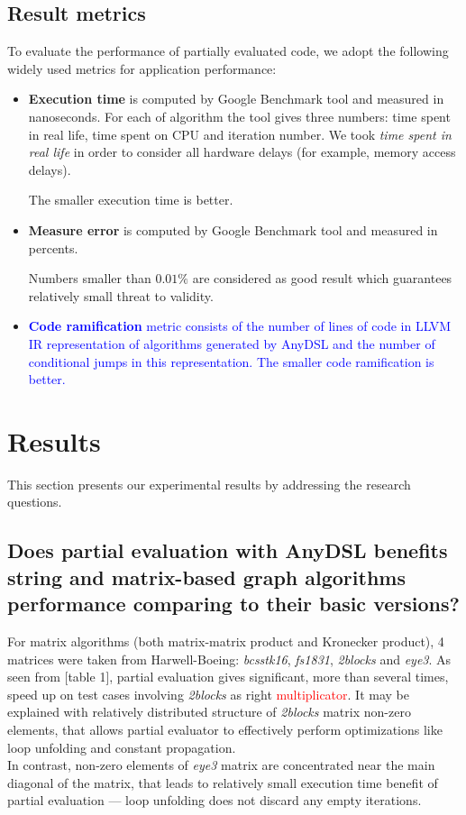 \documentclass[conference]{IEEEtran}
\begin{document}
\subsection{Result metrics}
To evaluate the performance of partially evaluated code, we adopt the following widely used metrics for application performance:
\begin{itemize}
	\item \textbf{Execution time} is computed by Google Benchmark tool and measured in nanoseconds. For each of algorithm the tool gives three numbers: time spent in real life, time spent on CPU and iteration number. We took \textit{time spent in real life} in order to consider all hardware delays (for example, memory access delays).
	
	The smaller execution time is better.
	
	\item \textbf{Measure error} is computed by Google Benchmark tool and measured in percents. 
	
	Numbers smaller than $0.01\%$ are considered as good result which guarantees relatively small threat to validity.
	
	\item \textcolor{blue}{\textbf{Code ramification} metric consists of the number of lines of code in LLVM IR representation of algorithms generated by AnyDSL and the number of conditional jumps in this representation.	
	The smaller code ramification is better.}
\end{itemize}

\section{Results}
This section presents our experimental results by addressing the research questions.

\subsection{Does partial evaluation with AnyDSL benefits string and matrix-based graph algorithms performance comparing to their basic versions?}

For matrix algorithms (both matrix-matrix product and Kronecker product), 4 matrices were taken from Harwell-Boeing: \textit{bcsstk16}, \textit{fs1831}, \textit{2blocks} and \textit{eye3}. As seen from [table 1], partial evaluation gives significant, more than several times, speed up on test cases involving \textit{2blocks} as right \textcolor{red}{multiplicator}. It may be explained with relatively distributed structure of \textit{2blocks} matrix non-zero elements, that allows partial evaluator to effectively perform optimizations like loop unfolding and constant propagation.\\
In contrast, non-zero elements of \textit{eye3} matrix are concentrated near the main diagonal of the matrix, that leads to relatively small execution time benefit of partial evaluation --- loop unfolding does not discard any empty iterations.
\end{document}
